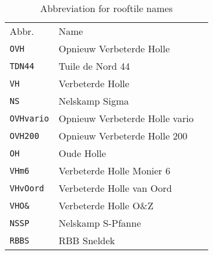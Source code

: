 \begin{table}[H]
    \begin{tabular}{lll}
        Abbr.        & Name \\
        \verb|OVH|  & Opnieuw Verbeterde Holle \\
        \verb|TDN44|    & Tuile de Nord 44 \\
        \verb|VH|   & Verbeterde Holle  \\
        \verb|NS|   & Nelskamp Sigma \\
        \verb|OVHvario| & Opnieuw Verbeterde Holle vario \\
        \verb|OVH200|   & Opnieuw Verbeterde Holle 200 \\
        \verb|OH|   & Oude Holle \\
        \verb|VHm6| & Verbeterde Holle Monier 6 \\
        \verb|VHvOord|  & Verbeterde Holle van Oord \\
        \verb|VHO&|  &  Verbeterde Holle O\&Z \\
        \verb|NSSP| & Nelskamp S-Pfanne \\
        \verb|RBBS| & RBB Sneldek
    \end{tabular}
    \caption{Abbreviation for rooftile names}
    \label{tab:abbr_rooftile_names}
\end{table}